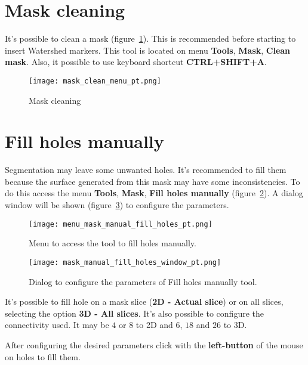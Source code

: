 \section{Mask cleaning}
\label{cap:limpeza_mascara}

It's possible to clean a mask (figure~\ref{fig:limpeza_mascara}). This is recommended before starting to insert Watershed markers. This tool is located on menu \textbf{Tools}, \textbf{Mask}, \textbf{Clean mask}. Also, it possible to use keyboard shortcut \textbf{CTRL+SHIFT+A}.

\begin{figure}[!htb]
\centering
\texttt{[image: mask\_clean\_menu\_pt.png]}
\caption{Mask cleaning}
\label{fig:limpeza_mascara}
\end{figure}

\section{Fill holes manually}

Segmentation may leave some unwanted holes. It's recommended to fill them because the surface generated from this mask may have some inconsistencies. To do this access the menu \textbf{Tools}, \textbf{Mask}, \textbf{Fill holes manually} (figure~\ref{fig:menu_mask_manual_fill_holes}). A dialog window will be shown (figure~\ref{fig:mask_manual_fill_holes_window}) to configure the parameters.

\begin{figure}[!htb]
\centering
\texttt{[image: menu\_mask\_manual\_fill\_holes\_pt.png]}
\caption{Menu to access the tool to fill holes manually.}
\label{fig:menu_mask_manual_fill_holes}
\end{figure}

\begin{figure}[!htb]
\centering
\texttt{[image: mask\_manual\_fill\_holes\_window\_pt.png]}
\caption{Dialog to configure the parameters of Fill holes manually tool.}
\label{fig:mask_manual_fill_holes_window}
\end{figure}

It's possible to fill hole on a mask slice (\textbf{2D - Actual slice}) or on all slices, selecting the option \textbf{3D - All slices}. It's also possible to configure the connectivity used. It may be $4$ or $8$ to 2D and $6$, $18$ and $26$ to 3D.

After configuring the desired parameters click with the \textbf{left-button} of the mouse on holes to fill them.

